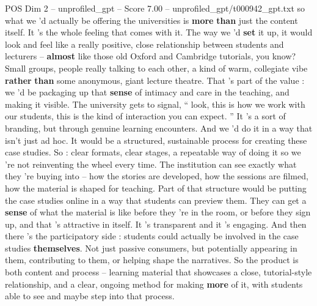 \begin{textsample}{POS Dim 2 – unprofiled\_gpt – Score 7.00 – unprofiled\_gpt/t000942\_gpt.txt}  \label{ex:f2_pos_027}
so what we ’d actually be offering the universities is \textbf{more} \textbf{than} just the content itself.
It ’s the whole feeling that comes with it.
The way we ’d \textbf{set} it up, it would look and feel like a really positive, close relationship between students and lecturers – \textbf{almost} like those old Oxford and Cambridge tutorials, you know?
Small groups, people really talking to each other, a kind of warm, collegiate vibe \textbf{rather} \textbf{than} some anonymous, giant lecture theatre.
That ’s part of the value : we ’d be packaging up that \textbf{sense} of intimacy and care in the teaching, and making it visible.
The university gets to signal, “ look, this is how we work with our students, this is the kind of interaction you can expect. ” It ’s a sort of branding, but through genuine learning encounters.
And we ’d do it in a way that isn't just ad hoc.
It would be a structured, sustainable process for creating these case studies.
So : clear formats, clear stages, a repeatable way of doing it so we ’re not reinventing the wheel every time.
The institution can see exactly what they ’re buying into – how the stories are developed, how the sessions are filmed, how the material is shaped for teaching.
Part of that structure would be putting the case studies online in a way that students can preview them.
They can get a \textbf{sense} of what the material is like before they ’re in the room, or before they sign up, and that ’s attractive in itself.
It ’s transparent and it ’s engaging.
And then there ’s the participatory side : students could actually be involved in the case studies \textbf{themselves}.
Not just passive consumers, but potentially appearing in them, contributing to them, or helping shape the narratives.
So the product is both content and process – learning material that showcases a close, tutorial-style relationship, and a clear, ongoing method for making \textbf{more} of it, with students able to see and maybe step into that process.

\end{textsample}
